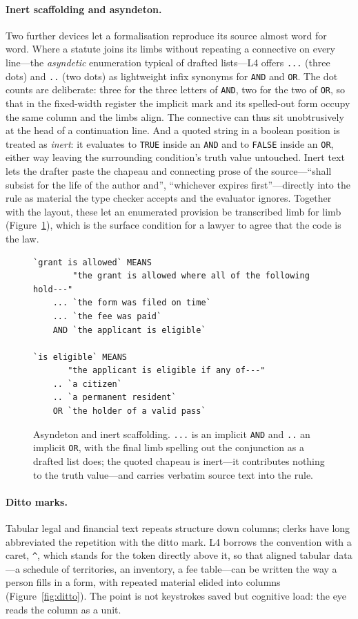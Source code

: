 \documentclass[sigconf,nonacm]{acmart}
\newcommand{\code}[1]{\texttt{\small #1}}
\begin{document}
\paragraph{Inert scaffolding and asyndeton.}
Two further devices let a formalisation reproduce its source almost word for
word. Where a statute joins its limbs without repeating a connective on every
line---the \emph{asyndetic} enumeration typical of drafted lists---L4 offers
\code{...} (three dots) and \code{..} (two dots) as lightweight infix synonyms
for \code{AND} and \code{OR}. The dot counts are deliberate: three for the three
letters of \code{AND}, two for the two of \code{OR}, so that in the fixed-width
register the implicit mark and its spelled-out form occupy the same column and
the limbs align. The connective can thus sit unobtrusively at the head of a
continuation line. And a quoted string in a boolean position is treated as
\emph{inert}: it evaluates to \code{TRUE} inside an \code{AND} and to
\code{FALSE} inside an \code{OR}, either way leaving the surrounding condition's
truth value untouched. Inert text lets the drafter paste the chapeau and
connecting prose of the source---``shall subsist for the life of the author
and'', ``whichever expires first''---directly into the rule as material the type
checker accepts and the evaluator ignores. Together with the layout, these let an
enumerated provision be transcribed limb for limb (Figure~\ref{fig:asyndeton}),
which is the surface condition for a lawyer to agree that the code is the law.

\begin{figure}[t]
\begin{lstlisting}
`grant is allowed` MEANS
        "the grant is allowed where all of the following hold---"
    ... `the form was filed on time`
    ... `the fee was paid`
    AND `the applicant is eligible`

`is eligible` MEANS
       "the applicant is eligible if any of---"
    .. `a citizen`
    .. `a permanent resident`
    OR `the holder of a valid pass`
\end{lstlisting}
\caption{Asyndeton and inert scaffolding. \code{...} is an implicit \code{AND}
and \code{..} an implicit \code{OR}, with the final limb spelling out the
conjunction as a drafted list does; the quoted chapeau is inert---it contributes
nothing to the truth value---and carries verbatim source text into the rule.}
\label{fig:asyndeton}
\end{figure}

\paragraph{Ditto marks.}
Tabular legal and financial text repeats structure down columns; clerks have
long abbreviated the repetition with the ditto mark. L4 borrows the
convention with a caret, \code{\textasciicircum}, which stands for the token directly above
it, so that aligned tabular data---a schedule of territories, an inventory,
a fee table---can be written the way a person fills in a form, with repeated
material elided into columns (Figure~\ref{fig:ditto}). The point is not
keystrokes saved but cognitive load: the eye reads the column as a unit.
\end{document}
